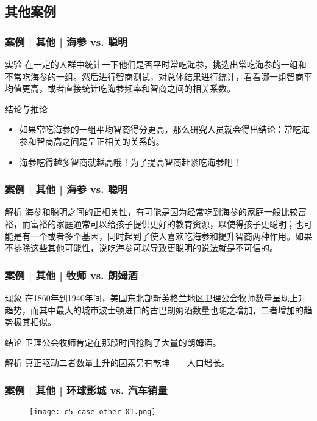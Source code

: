 \subsection{其他案例}
\begin{frame}
  \frametitle{案例 | 其他 | 海参 vs. 聪明}
  \begin{block}{实验}
在一定的人群中统计一下他们是否平时常吃海参，挑选出常吃海参的一组和不常吃海参的一组。然后进行智商测试，对总体结果进行统计，看看哪一组智商平均值更高，或者直接统计吃海参频率和智商之间的相关系数。
  \end{block}
  \pause
  \begin{block}{结论与推论}
    \begin{itemize}
      \item 如果常吃海参的一组平均智商得分更高，那么研究人员就会得出结论：常吃海参和智商高之间是呈正相关的关系的。
      \item 海参吃得越多智商就越高哦！为了提高智商赶紧吃海参吧！
    \end{itemize}
  \end{block}
\end{frame}

\begin{frame}
  \frametitle{案例 | 其他 | 海参 vs. 聪明}
  \begin{block}{解析}
海参和聪明之间的正相关性，有可能是因为经常吃到海参的家庭一般比较富裕，而富裕的家庭通常可以给孩子提供更好的教育资源，以使得孩子更聪明；也可能是有一个或者多个基因，同时起到了使人喜欢吃海参和提升智商两种作用。如果不排除这些其他可能性，说吃海参可以导致更聪明的说法就是不可信的。
  \end{block}
\end{frame}

\begin{frame}
  \frametitle{案例 | 其他 | 牧师 vs. 朗姆酒}
  \begin{block}{现象}
 在1860年到1940年间，美国东北部新英格兰地区卫理公会牧师数量呈现上升趋势，而其中最大的城市波士顿进口的古巴朗姆酒数量也随之增加，二者增加的趋势极其相似。
    \end{block}
  \pause
  \begin{block}{结论}
卫理公会牧师肯定在那段时间抢购了大量的朗姆酒。
  \end{block}
  \pause \pause \pause \pause
  \begin{block}{解析}
真正驱动二者数量上升的因素另有乾坤——人口增长。
  \end{block}
\end{frame}

\begin{frame}
  \frametitle{案例 | 其他 | 环球影城 vs. 汽车销量}
  \begin{figure}
    \centering
    \texttt{[image: c5\_case\_other\_01.png]}
  \end{figure}
\end{frame}

